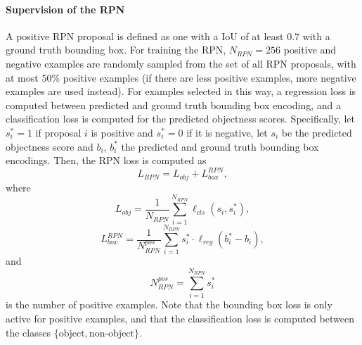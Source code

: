\paragraph{Supervision of the RPN}
A positive RPN proposal is defined as one with a IoU of at least $0.7$ with
a ground truth bounding box. For training the RPN, $N_{RPN} = 256$  positive and negative
examples are randomly sampled from the set of all RPN proposals,
with at most $50\%$ positive examples (if there are less positive examples,
more negative examples are used instead).
For examples selected in this way, a regression loss is computed between
predicted and ground truth bounding box encoding, and a classification loss
is computed for the predicted objectness scores.
Specifically, let $s_i^* = 1$ if proposal $i$ is positive and $s_i^* = 0$ if
it is negative, let $s_i$ be the predicted objectness score and $b_i$, $b_i^*$ the
predicted and ground truth bounding box encodings.
Then, the RPN loss is computed as
\begin{equation}
L_{RPN} = L_{obj} + L_{box}^{RPN},
\end{equation}
where
\begin{equation}
L_{obj} = \frac{1}{N_{RPN}} \sum_{i=1}^{N_{RPN}} \ell_{cls}(s_i, s_i^*),
\end{equation}
\begin{equation}
L_{box}^{RPN} = \frac{1}{N_{RPN}^{pos}} \sum_{i=1}^{N_{RPN}} s_i^* \cdot \ell_{reg}(b_i^* - b_i),
\end{equation}
and
\begin{equation}
N_{RPN}^{pos} = \sum_{i=1}^{N_{RPN}} s_i^*
\end{equation}
is the number of positive examples. Note that the bounding box loss is only
active for positive examples, and that the classification loss is computed
between the classes $\{\textrm{object},\textrm{non-object}\}$.

